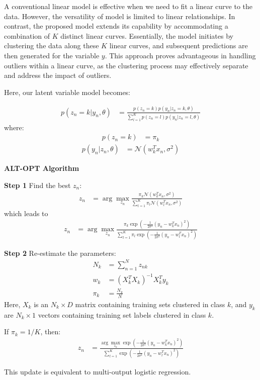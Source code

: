 \documentclass[a4paper,11pt]{article}
\begin{document}
\begin{mlsolution}

\begin{flushleft}
	A conventional linear model is effective when we need to fit a linear curve to the data. However, the versatility of model is limited to linear relationships. In contrast, the proposed model extends its capability by accommodating a combination of $K$ distinct linear curves. Essentially, the model initiates by clustering the data along these $K$ linear curves, and subsequent predictions are then generated for the variable $y$. This approach proves advantageous in handling outliers within a linear curve, as the clustering process may effectively separate and address the impact of outliers.
\end{flushleft}

\begin{flushleft}
	Here, our latent variable model becomes:
\end{flushleft}
\setcounter{equation}{0} %
\begin{align}
	p(z_n = k|y_n, \theta) &= \frac{p(z_n = k)p(y_n|z_n = k, \theta)}{\sum_{l=1}^K p(z_n = l)p(y_n|z_n = l, \theta)}
\end{align}
where:
\begin{align}
	p(z_n = k) &= \pi_k 
\end{align}
\begin{align}
	p(y_n|z_n, \theta) &= \mathcal{N}(w_k^T x_n, \sigma^2)
\end{align}

\textbf{ALT-OPT Algorithm}

\textbf{Step 1} Find the best $z_n$:
\begin{align}
	z_n &= \arg\max_{z_n} \frac{\pi_k \mathcal{N}(w_k^T x_n, \sigma^2)}{\sum_{l=1}^K \pi_l \mathcal{N}(w_l^T x_n, \sigma^2)}
\end{align}
which leads to
\begin{align}
	z_n &= \arg\max_{z_n} \frac{\pi_k \exp\left(-\frac{1}{2\sigma^2} (y_n - w_k^T x_n)^2\right)}{\sum_{l=1}^K \pi_l \exp\left(-\frac{1}{2\sigma^2} (y_n - w_l^T x_n)^2\right)}
\end{align}

\textbf{Step 2} Re-estimate the parameters:
\begin{align}
	N_k &= \sum_{n=1}^N z_{nk} \\
	w_k &= (X_k^T X_k)^{-1} X_k^T y_k \\
	\pi_k &= \frac{N_k}{N}
\end{align}
Here, $X_k$ is an $N_k \times D$ matrix containing training sets clustered in class $k$, and $y_k$ are $N_k \times 1$ vectors containing training set labels clustered in class $k$.

If $\pi_k = 1/K$, then:
\begin{align}
	z_n &= \frac{\arg\max_{z_n} \exp\left(-\frac{1}{2\sigma^2} (y_n - w_k^T x_n)^2\right)}{\sum_{l=1}^K \exp\left(-\frac{1}{2\sigma^2} (y_n - w_l^T x_n)^2\right)}
\end{align}

This update is equivalent to multi-output logistic regression.

\end{mlsolution}
	
\end{document}
